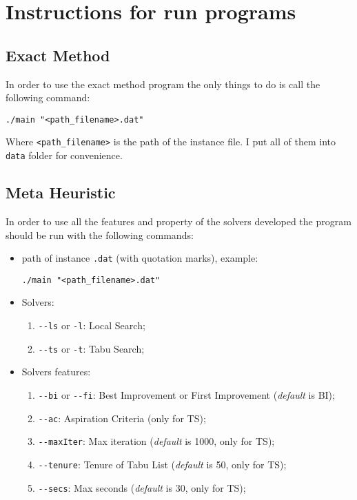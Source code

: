 \appendix
\section{Instructions for run programs}

	\subsection{Exact Method}
		In order to use the exact method program the only things to do is call the following command:
		\begin{center}
			\verb|./main "<path_filename>.dat"|
		\end{center}	
		Where \verb|<path_filename>| is the path of the instance file. I put all of them into \verb|data| folder for convenience.
	
	\subsection{Meta Heuristic}
		In order to use all the features and property of the solvers developed the program should be run with the following commands:
		
		\begin{itemize}
			\item path of instance \verb|.dat| (with quotation marks), example:
			\begin{center}
				\verb|./main "<path_filename>.dat"|
			\end{center}
			\item Solvers:
			\begin{enumerate}
				\item \verb|--ls| or \verb|-l|: Local Search;
				\item \verb|--ts| or \verb|-t|: Tabu Search;
			\end{enumerate}
			\item Solvers features:
			\begin{enumerate}
				\item \verb|--bi| or \verb|--fi|: Best Improvement or First Improvement (\textit{default} is BI);
				\item \verb|--ac|: Aspiration Criteria (only for TS);
				\item \verb|--maxIter|: Max iteration (\textit{default} is 1000, only for TS);
				\item \verb|--tenure|: Tenure of Tabu List (\textit{default} is 50, only for TS);
				\item \verb|--secs|: Max seconds (\textit{default} is 30, only for TS);
			\end{enumerate}
		\end{itemize}
	
